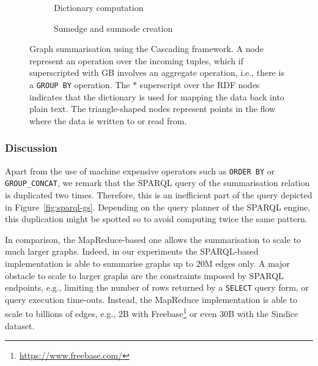 \begin{figure}
	\centering
	\begin{subfigure}{\textwidth}
		\centering
		\resizebox{.6\textwidth}{!}{
			
		}
		\caption{Dictionary computation}
		\label{fig:dict-cascading}
	\end{subfigure}
	\qquad
	\begin{subfigure}{\textwidth}
		\centering
		\resizebox{\textwidth}{!}{
			
		}
		\caption{Sumedge and sumnode creation}
		\label{fig:va-cascading}
	\end{subfigure}
	\caption{Graph summarisation using the Cascading framework. A node represent an operation over the incoming tuples, which if superscripted with GB involves an aggregate operation, i.e., there is a \texttt{GROUP BY} operation. The $*$ superscript over the RDF nodes indicates that the dictionary is used for mapping the data back into plain text. The triangle-shaped nodes represent points in the flow where the data is written to or read from.}
	\label{fig:summary-cascading}
\end{figure}

\subsubsection{Discussion}

Apart from the use of machine expensive operators such as \texttt{ORDER BY} or \texttt{GROUP\_CONCAT}, we remark that the SPARQL query of the summarisation relation is duplicated two times. Therefore, this is an inefficient part of the query depicted in Figure~\ref{fig:sparql-gs}. Depending on the query planner of the SPARQL engine, this duplication might be spotted so to avoid computing twice the same pattern.

In comparison, the MapReduce-based one allows the summarisation to scale to much larger graphs. Indeed, in our experiments the SPARQL-based implementation is able to summarise graphs up to 20M edges only. A major obstacle to scale to larger graphs are the constraints imposed by SPARQL endpoints, e.g., limiting the number of rows returned by a \texttt{SELECT} query form, or query execution time-outs. Instead, the MapReduce implementation is able to scale to billions of edges, e.g., 2B with Freebase\footnote{\url{https://www.freebase.com/}} or even 30B with the Sindice dataset.


